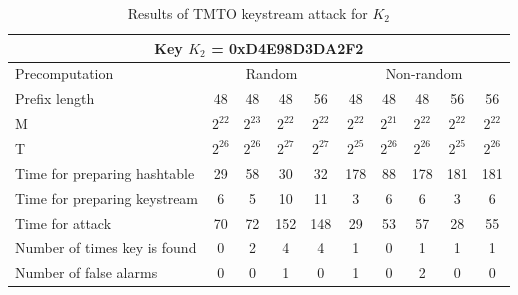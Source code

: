 \begin{table}[ht!]
\begin{center}
\begin{tabular}{|p{3cm}||c|c|c|c|c|c|c|c|c|}
\hline
\multicolumn{10}{|c|}{\textbf{Key $K_2$ = 0xD4E98D3DA2F2}} \\ \hline \hline
Precomputation 	& \multicolumn{4}{c|}{Random} & \multicolumn{5}{c|}{Non-random} \\ \hline
Prefix length										&	48 				&	48 				&	48 				&	56 				&	48 				&	48				&	48 				&	56 				&	56  			\\ \hline
M																&	$2^{22}$ 	&	$2^{23}$ 	&	$2^{22}$ 	&	$2^{22}$ 	&	$2^{22}$ 	&	$2^{21}$ 	&	$2^{22}$ 	&	$2^{22}$ 	& $2^{22}$	\\ \hline
T	  														&	$2^{26}$ 	&	$2^{26}$ 	&	$2^{27}$ 	&	$2^{27}$	&	$2^{25}$ 	&	$2^{26}$ 	&	$2^{26}$ 	& $2^{25}$ 	& $2^{26}$	\\ \hline
Time for preparing hashtable		&	29 				&	58 				&	30 				&	32 				&	178 			&	88				& 178				&	181 			& 181				\\ \hline
Time for preparing keystream		&	6 				&	5 				&	10 				&	11 				&	3 				&	6					& 6					&	3					& 6					\\ \hline
Time for attack									&	70 				&	72 				&	152 			&	148 			&	29 				&	53				& 57 				&	28 				& 55				\\ \hline
Number of times key is found		&	0 				&	2 				&	4 				&	4 				&	1 				&	0					& 1 				&	1 				& 1					\\ \hline
Number of false alarms					&	0 				&	0 				&	1 				&	0 				&	1 				&	0					& 2 				& 0 				& 0					\\ \hline
\end{tabular}
\end{center}
\caption{Results of TMTO keystream attack for $K_2$}
\label{tab:keystream-attack-results-key2}
\end{table}


